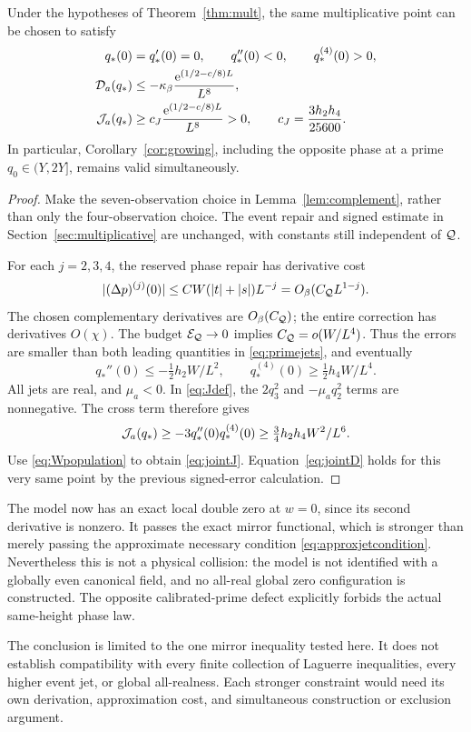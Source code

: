 \begin{theorem}\label{thm:joint}
Under the hypotheses of Theorem~\ref{thm:mult}, the same
multiplicative point can be chosen to satisfy
\begin{align}
 q_*(0)&=q_*'(0)=0,\qquad q_*''(0)<0,\qquad q_*^{(4)}(0)>0,\\
 \mathcal D_a(q_*)&\le-\kappa_\beta\frac{\mathrm e^{(1/2-c/8)L}}{L^8},
 \label{eq:jointD}\\
 \mathcal J_a(q_*)&\ge c_J\frac{\mathrm e^{(1/2-c/8)L}}{L^8}>0,\qquad
 c_J=\frac{3h_2h_4}{25600}.
 \label{eq:jointJ}
\end{align}
In particular, Corollary~\ref{cor:growing}, including the opposite phase
at a prime \(q_0\in(Y,2Y]\), remains valid simultaneously.
\end{theorem}
\begin{proof}
Make the seven-observation choice in Lemma~\ref{lem:complement}, rather
than only the four-observation choice. The event repair and signed
estimate in Section~\ref{sec:multiplicative} are unchanged, with
constants still independent of \(\mathcal Q\).

For each \(j=2,3,4\), the reserved phase repair has derivative cost
\[
 |(\Delta p)^{(j)}(0)|
 \le C W(|t|+|s|)L^{-j}
 =O_\beta(C_{\mathcal Q}L^{1-j}).
\]
The chosen complementary derivatives are \(O_\beta(C_{\mathcal Q})\);
the entire correction has derivatives \(O(\chi)\).
The budget \(\mathcal E_{\mathcal Q}\to0\) implies
\(C_{\mathcal Q}=o(W/L^4)\). Thus the errors are smaller than both leading
quantities in \eqref{eq:primejets}, and eventually
\begin{equation}\label{eq:finaljets}
 q_*''(0)\le-\tfrac12h_2W/L^2,\qquad
 q_*^{(4)}(0)\ge\tfrac12h_4W/L^4.
\end{equation}
All jets are real, and \(\mu_a<0\). In \eqref{eq:Jdef},
the \(2q_3^2\) and \(-\mu_a q_2^2\) terms are nonnegative.
The cross term therefore gives
\[
 \mathcal J_a(q_*)\ge-3q_*''(0)q_*^{(4)}(0)
        \ge\tfrac34h_2h_4W^2/L^6.
\]
Use \eqref{eq:Wpopulation} to obtain \eqref{eq:jointJ}.
Equation~\eqref{eq:jointD} holds for this very same point by the
previous signed-error calculation.
\end{proof}

The model now has an exact local double zero at \(w=0\), since its
second derivative is nonzero. It passes the exact mirror functional,
which is stronger than merely passing the approximate necessary
condition \eqref{eq:approxjetcondition}. Nevertheless this is not
a physical collision: the model is not identified with a globally
even canonical field, and no all-real global zero configuration is
constructed. The opposite calibrated-prime defect explicitly forbids
the actual same-height phase law.

The conclusion is limited to the one mirror inequality tested here.
It does not establish compatibility with every finite collection of
Laguerre inequalities, every higher event jet, or global all-realness.
Each stronger constraint would need its own derivation, approximation
cost, and simultaneous construction or exclusion argument.
